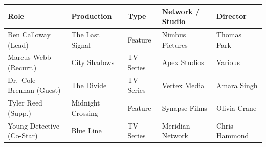\documentclass[11pt,letterpaper]{article}
\begin{document}
\begin{minipage}[t]{0.67\textwidth}
  {\footnotesize
  \begin{tabularx}{\linewidth}{@{}P{2.7cm} Z P{1.5cm} P{2.3cm} P{2.1cm}@{}}
    \toprule
    \textbf{Role} & \textbf{Production} & \textbf{Type} & \textbf{Network / Studio} & \textbf{Director} \\
    \midrule
    Ben Calloway (Lead) & The Last Signal & Feature & Nimbus Pictures & Thomas Park \\
    Marcus Webb (Recurr.) & City Shadows & TV Series & Apex Studios & Various \\
    Dr.\ Cole Brennan (Guest) & The Divide & TV Series & Vertex Media & Amara Singh \\
    Tyler Reed (Supp.) & Midnight Crossing & Feature & Synapse Films & Olivia Crane \\
    Young Detective (Co-Star) & Blue Line & TV Series & Meridian Network & Chris Hammond \\
    \bottomrule
  \end{tabularx}}
\end{minipage}\par

\newpage

\vspace*{0.2cm}


\vspace*{0.45cm}
\end{document}
